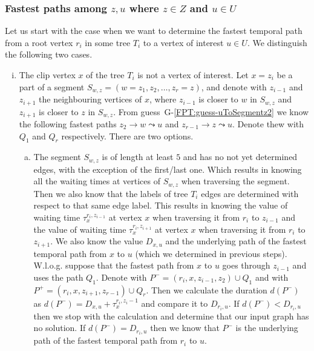 \documentclass[11pt,a4paper]{article}
\theoremstyle{remark}
\theoremstyle{definition}
\begin{document}
\subsubsection*{\boldmath Fastest paths among $z,u$ where $z \in Z$ and $u \in U$}
Let us start with the case when we want to determine the fastest temporal path from a root vertex $r_i$ in some tree $T_i$ to a vertex of interest $u \in U$.
We distinguish the following two cases.
\begin{enumerate}[(i)]
    \item The clip vertex $x$ of the tree $T_i$ is not a vertex of interest.
    Let $x = z_i$ be a part of a segment $S_{w,z} = (w = z_1, z_2, \dots, z_r = z)$, and denote with $z_{i-1}$ and $z_{i+1}$ the neighbouring vertices of $x$, 
    where $z_{i-1}$ is closer to $w$ in $S_{w,z}$ and 
    $z_{i+1}$ is closer to $z$ in $S_{w,z}$.
    From guess~G-\ref{FPT:guess-uToSegmentz2} we know the following fastest paths $z_{2} \rightarrow w \leadsto u$ and %
    $z_{r-1} \rightarrow z \leadsto u$.
    Denote thew with $Q_1$ and $Q_r$ respectively.
    There are two options.
    \begin{enumerate}[(a)]
        \item The segment $S_{w,z}$ is of length at least $5$ and has no not yet determined edges, with the exception of the first/last one.
        Which results in knowing all the waiting times at vertices of $S_{w,z}$ when traversing the segment.
        Then we also know that the labels of tree $T_i$ edges are determined with respect to that same edge label.
        This results in knowing the value of waiting time
        $\tau_x^{r_i,z_{i-1}}$ at vertex $x$ when traversing it from $r_i$ to $z_{i-1}$ and 
        the value of waiting time $\tau_x^{r_i,z_{i+1}}$ at vertex $x$
        when traversing it from $r_i$ to $z_{i+1}$.
        We also know the value $D_{x,u}$ and the underlying path of the fastest temporal path from $x$ to $u$ (which we determined in previous steps).
        W.l.o.g. suppose that the fastest path from $x$ to $u$ goes through $z_{i-1}$ and uses the path $Q_1$.
        Denote with $P^{-} = (r_i, x, z_{i-1}, z_2) \cup Q_1$
        and with $P^{+} = (r_i, x, z_{i+1}, z_{r-1}) \cup Q_r$.
        Then we calculate the duration $d(P^{-})$ as $d(P^{-}) = D_{x,u} + \tau_x^{r_i,z_i-1}$
        and compare it to $D_{r_i,u}$.
        If $d(P^{-}) < D_{r_i,u} $ then we stop with the calculation and determine that our input graph has no solution.
        If $d(P^{-}) = D_{r_i,u} $ then we know that $P^{-}$ is the underlying path of the fastest temporal path from $r_i$ to $u$. 

\end{enumerate}
\end{enumerate}
\end{document}
